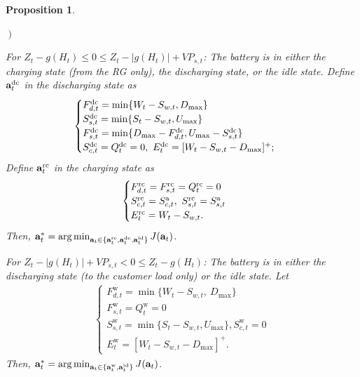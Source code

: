 \documentclass[journal]{IEEEtran}
\def\abf{{\bf a}}
\def\w{\textrm{w}}
\newtheorem{proposition}{Proposition}
\begin{document}
\begin{proposition}
\begin{list}{{\it {}$\left.\right)$~}}
\item{\it For $Z_t-g(H_t)\le 0\le Z_t-|g(H_t)|+VP_{s,t}$}: The battery is  in either the charging state (from the RG only), the discharging state, or the idle state. Define  $\abf_t^\text{dc}$ in the discharging state as
  \begin{align}\label{case d 2}
\hspace*{-.5em}
      \begin{cases}
      F^\text{dc}_{d,t}=\min\{W_t-S_{w,t},D_{\max}\}\\
      S^\text{dc}_{s,t}=\min\{S_t-S_{w,t},U_{\max}\} \\
      F^\text{dc}_{s,t}=\min\{D_{\max}-F^\text{dc}_{d,t},U_{\max}-S^\text{dc}_{s,t}\}\\
      S^\text{dc}_{c,t}=Q^\text{dc}_t=0, \ E^\text{dc}_t=[W_t-S_{w,t}-D_{\max}]^+;
      \end{cases}
  \end{align}
Define $\abf_t^\text{rc}$ in the charging state as
  \begin{align}\label{case d 3}
\hspace*{-.5em}
      \begin{cases}
      F^\text{rc}_{d,t}=F^\text{rc}_{s,t}=Q^\text{rc}_t=0 \ \\
      S^\text{rc}_{c,t}=S^\text{a}_{c,t}, \ S^\text{rc}_{s,t}=S^\text{a}_{s,t}\\
      E^\text{rc}_t= W_t-S_{w,t}.
      \end{cases}
  \end{align}
Then, $\abf^*_t=\arg\min_{\abf_t\in\{\abf_t^\text{rc},\abf_t^\text{dc},\abf_t^\textrm{id}\}} J(\abf_t)$.

\item{\it For $Z_t-|g(H_t)|+VP_{s,t}<0 \le Z_t-g(H_t)$}: The battery is in either the discharging state (to the customer load only) or the idle state. Let
  \begin{align}\label{case f}
      \begin{cases}
      F^\w_{d,t}=\min\{W_t-S_{w,t},\ D_{\max}\}\\  F^\w_{s,t}=Q^\w_t=0\\
      S^\w_{s,t}=\min\{S_t-S_{w,t},U_{\max}\},S^\w_{c,t}=0\\
      E^\w_t=[W_t-S_{w,t}-D_{\max}]^+.
      \end{cases}
  \end{align}
Then, $\abf^*_t=\arg\min_{\abf_t\in\{\abf_t^\w,\abf_t^\textrm{id}\}} J(\abf_t)$.



\end{list}
\end{proposition}
\end{document}
